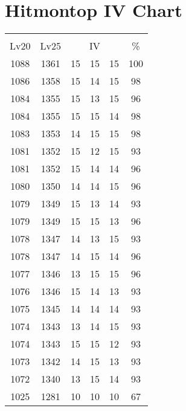 \documentclass{article}%
\begin{document}
%
\normalsize%
\section{Hitmontop IV Chart}%
\label{sec:Hitmontop IV Chart}%
\renewcommand{\arraystretch}{1.5}%
\begin{tabular}{|c|c|c|c|c|c|}%
\hline%
\multicolumn{6}{|c|}{\textcolor{white}{ 
\linebreak{Hitmontop}
}%
\cellcolor{black}}\\%
\multicolumn{1}{|c}{Lv20}&\multicolumn{1}{c|}{Lv25}&\multicolumn{3}{c|}{IV}&\multicolumn{1}{|c|}{\%}\\%
\hline%
\rowcolor{color100}%
1088&1361&15&15&15&100\\%
\hline%
\rowcolor{color98}%
1086&1358&15&14&15&98\\%
\hline%
\rowcolor{color96}%
1084&1355&15&13&15&96\\%
\hline%
\rowcolor{color98}%
1084&1355&15&15&14&98\\%
\hline%
\rowcolor{color98}%
1083&1353&14&15&15&98\\%
\hline%
\rowcolor{color93}%
1081&1352&15&12&15&93\\%
\hline%
\rowcolor{color96}%
1081&1352&15&14&14&96\\%
\hline%
\rowcolor{color96}%
1080&1350&14&14&15&96\\%
\hline%
\rowcolor{color93}%
1079&1349&15&13&14&93\\%
\hline%
\rowcolor{color96}%
1079&1349&15&15&13&96\\%
\hline%
\rowcolor{color93}%
1078&1347&14&13&15&93\\%
\hline%
\rowcolor{color96}%
1078&1347&14&15&14&96\\%
\hline%
\rowcolor{color96}%
1077&1346&13&15&15&96\\%
\hline%
\rowcolor{color93}%
1076&1346&15&14&13&93\\%
\hline%
\rowcolor{color93}%
1075&1345&14&14&14&93\\%
\hline%
\rowcolor{color93}%
1074&1343&13&14&15&93\\%
\hline%
\rowcolor{color93}%
1074&1343&15&15&12&93\\%
\hline%
\rowcolor{color93}%
1073&1342&14&15&13&93\\%
\hline%
\rowcolor{color93}%
1072&1340&13&15&14&93\\%
\hline%
\rowcolor{color91}%
1025&1281&10&10&10&67\\%
\end{tabular}

%
\end{document}
